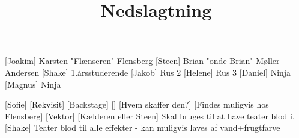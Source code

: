 \documentclass[a4paper,11pt]{article}
\title{Nedslagtning}
\begin{document}
\maketitle

\begin{roles}
[Joakim] Karsten "Flænseren" Flensberg
[Steen] Brian "onde-Brian" Møller Andersen
[Shake] 1.årsstuderende
[Jakob] Rus 2
[Helene] Rus 3
[Daniel] Ninja
[Magnus] Ninja
\end{roles}


\begin{props}
[Sofie]
[Rekvisit]
[Backstage]
[]
[Hvem skaffer den?]
[Findes muligvis hos Flensberg]
[Vektor]
[Kælderen eller Steen]
Skal bruges til at have teater blod i.
[Shake] Teater blod til alle effekter - kan muligvis laves af vand+frugtfarve
\end{props}
\end{document}
